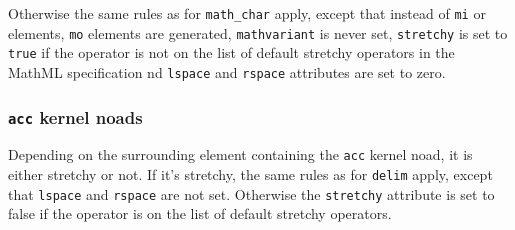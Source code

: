 Otherwise the same rules as for \texttt{math_char} apply,
except that instead of \texttt{mi} or  elements,
\texttt{mo} elements are generated,
\texttt{mathvariant} is never set,
\texttt{stretchy} is set to \texttt{true} if the operator is not on the list of default stretchy operators in the MathML specification 
nd \texttt{lspace} and \texttt{rspace} attributes are set to zero.

\subsubsection{\texttt{acc} kernel noads}
Depending on the surrounding element containing the \texttt{acc} kernel noad, it is either stretchy or not.
If it's stretchy, the same rules as for \texttt{delim} apply, except that \texttt{lspace} and \texttt{rspace} are not set.
Otherwise the \texttt{stretchy} attribute is set to false if the operator is on the list of default stretchy operators.
